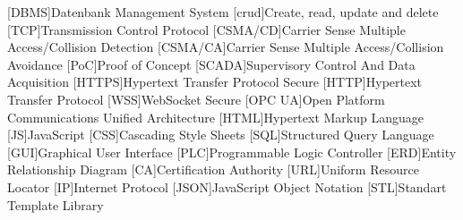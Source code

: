 \begin{multicols}{2}
  \begin{acronym}
  [DBMS]{Datenbank Management  System}
  [crud]{Create, read, update and delete}
  [TCP]{Transmission Control Protocol}
  [CSMA/CD]{Carrier Sense Multiple Access/Collision Detection}
  [CSMA/CA]{Carrier Sense Multiple Access/Collision Avoidance}
  [PoC]{Proof of Concept}
  [SCADA]{Supervisory Control And Data Acquisition}
  [HTTPS]{Hypertext Transfer Protocol Secure}
  [HTTP]{Hypertext Transfer Protocol}
  [WSS]{WebSocket Secure}
  [OPC UA]{Open Platform Communications Unified Architecture}
  [HTML]{Hypertext Markup Language}
  [JS]{JavaScript}
  [CSS]{Cascading Style Sheets}
  [SQL]{Structured Query Language}
  [GUI]{Graphical User Interface}
  [PLC]{Programmable Logic Controller}
  [ERD]{Entity Relationship Diagram}
  [CA]{Certification Authority}
  [URL]{Uniform Resource Locator}
  [IP]{Internet Protocol}
  [JSON]{JavaScript Object Notation}
  [STL]{Standart Template Library}
\end{acronym}
\end{multicols}

